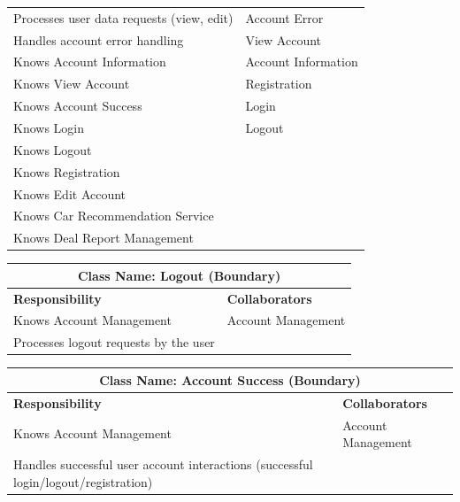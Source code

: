 \documentclass[]{article}
\begin{document}
\begin{itemize}
\begin{table}[H]
\begin{tabular}{|p{6cm}|p{6cm}|}
            Processes user data requests (view, edit) & Account Error\\
            Handles account error handling & View Account\\
            Knows Account Information & Account Information \\
            Knows View Account & Registration\\
            Knows Account Success & Login\\
            Knows Login & Logout\\
            Knows Logout & \\
            Knows Registration & \\
            Knows Edit Account & \\
            Knows Car Recommendation Service & \\
            Knows Deal Report Management & \\
            \hline
            \end{tabular}
        \end{table}
        \begin{table}[H]
            \centering
            \begin{tabular}{|p{6cm}|p{6cm}|}
            \hline 
             \multicolumn{2}{|c|}{\textbf{Class Name: Logout (Boundary)}} \\
            \hline
            \textbf{Responsibility} & \textbf{Collaborators} \\
            \hline
            Knows Account Management & Account Management\\
            Processes logout requests by the user & \\
            \hline
            \end{tabular}
        \end{table}
        \begin{table}[H]
            \centering
            \begin{tabular}{|p{6cm}|p{6cm}|}
            \hline 
             \multicolumn{2}{|c|}{\textbf{Class Name: Account Success (Boundary)}} \\
            \hline
            \textbf{Responsibility} & \textbf{Collaborators} \\
            \hline
            Knows Account Management & Account Management\\
            Handles successful user account interactions (successful login/logout/registration) & \\
            \hline

\end{tabular}
\end{table}
\end{itemize}
\end{document}

